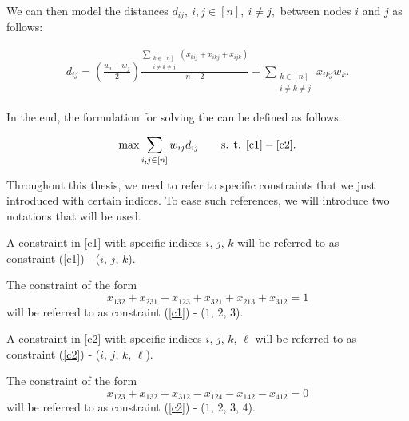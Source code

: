 We can then model the distances $ d_{ij},\  i,j \in [n],\ i \neq j,$ between nodes $i$ and $j$ as follows:

\begin{align*}
d_{ij} = \left(\frac{w_i+w_j}{2}\right)\frac{\sum_{\substack{k \in [n]\\ i \neq k \neq j }}\left(x_{kij} + x_{ikj} + x_{ijk}\right)}{n - 2} + \sum_{\substack{k \in [n]\\ i \neq k \neq j }}{x_{ikj} w_k}.
\end{align*}

In the end, the \ILP formulation for solving the \wLOP can be defined as follows:

\begin{align}\label{ilp}
\max \sum_{\substack{i,j \in [n]}} w_{ij}d_{ij}
\qquad	\text{s. t. } \eqref{c1}- \eqref{c2}.
\end{align}

Throughout this thesis, we need to refer to specific constraints that we just introduced with certain indices. To ease such references, we will introduce two notations that will be used.

\newpage
\begin{notation}
	A constraint in \ref{c1} with specific indices $i$, $j$, $k$ will be referred to as \\ constraint (\ref{c1}) - ($i$, $j$, $k$). \\
\end{notation}

\begin{example}
	The constraint of the form
	\begin{equation*}
	x_{132} + x_{231} + x_{123} + x_{321} + x_{213} + x_{312} = 1
	\end{equation*}
	will be referred to as constraint (\ref{c1}) - ($1$, $2$, $3$).
\end{example}

\begin{notation}
	A constraint in \ref{c2} with specific indices $i$, $j$, $k$, $\ell$ will be referred to as constraint (\ref{c2}) - ($i$, $j$, $k$, $\ell$). \\
\end{notation}

\begin{example}
	The constraint of the form
	\begin{equation*}
	x_{123} + x_{132} + x_{312} - x_{124} - x_{142} - x_{412}  = 0
	\end{equation*}
	will be referred to as constraint (\ref{c2}) - ($1$, $2$, $3$, $4$).
\end{example}
	


